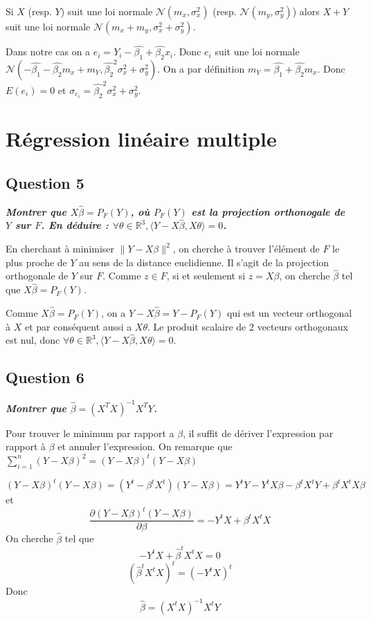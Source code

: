 \documentclass[pdflatex]{article}
\theoremstyle{definition}
\newcommand{\bb}[1]{\mathbb{#1}}
\newcommand{\R}{\bb{R}}
\newcommand{\quest}[1]{\textbf{\textit{#1}} \vspace{3mm}}
\begin{document}
Si $X$ (resp. $Y$) suit une loi normale $\mathscr{N}(m_x, \sigma_x^2)$ (resp. $\mathscr{N}(m_y, \sigma_y^2)$) alors $X+Y$ suit une loi normale $\mathscr{N}(m_x + m_y, \sigma_x^2+\sigma_y^2)$.

Dans notre cas on a $e_i = Y_i - \hat{\beta_1} + \hat{\beta_2}x_i$. Donc $e_i$ suit une loi normale  
$\mathscr{N}(- \hat{\beta_1} - \hat{\beta_2}m_x + m_Y, \hat{\beta_2}^2\sigma_x^2+\sigma_y^2)$. On a par d\'efinition $m_Y = \hat{\beta_1} + \hat{\beta_2}m_x$. Donc $E(e_i) = 0$ et $\sigma_{e_i} = \hat{\beta_2}^2\sigma_x^2+\sigma_y^2$.

\section*{R\'egression lin\'eaire multiple}
\subsection*{Question 5}
\quest{Montrer que $X\hat{\beta} = P_F(Y)$, o\`u $P_F(Y)$ est la projection orthonogale de $Y$ sur $F$. En d\'eduire : $\forall \theta \in \R^3, \langle Y - X\hat{\beta}, X\theta \rangle = 0$.}

En cherchant \`a minimiser $\lVert Y - X\beta \rVert^2$, on cherche \`a trouver l'\'el\'ement de $F$ le plus proche de $Y$ au sens de la distance euclidienne. Il s'agit de la projection orthogonale de $Y$ sur $F$. Comme $z \in F$, si et seulement si $z = X\beta$, on cherche $\hat{\beta}$ tel que $X\hat{\beta} = P_F(Y)$. 

Comme $X\hat{\beta} = P_F(Y)$, on a $Y - X\hat{\beta} = Y - P_F(Y)$ qui est un vecteur orthogonal \`a $X$ et par cons\'equent aussi a $X\theta$. Le produit scalaire de 2 vecteurs orthogonaux est nul, donc $\forall \theta \in \R^{3}, \langle Y - X\hat{\beta}, X\theta \rangle = 0$.

\subsection*{Question 6}
\quest{Montrer que $\hat{\beta} = (X^TX)^{-1}X^TY$.}

Pour trouver le minimum par rapport a $\beta$, il suffit de d\'eriver l'expression par rapport \`a $\beta$ et annuler l'expression. On remarque que $\sum_{i=1}^{n}{(Y-X\beta)^2} = (Y-X\beta)^t(Y-X\beta)$

$$
(Y-X\beta)^t(Y-X\beta) = (Y^t-\beta^tX^t)(Y-X\beta) = Y^tY-Y^tX\beta - \beta^tX^tY + \beta^tX^tX\beta
$$
et
$$
\frac{\partial (Y-X\beta)^t(Y-X\beta) }{\partial \beta} = -Y^tX + \beta^tX^tX
$$
On cherche $\hat{\beta}$ tel que
$$
-Y^tX + \hat{\beta}^tX^tX = 0
$$
$$
(\hat{\beta}^tX^tX)^t = (-Y^tX)^t
$$
Donc
$$
\hat{\beta} = (X^tX)^{-1}X^tY
$$
\end{document}
